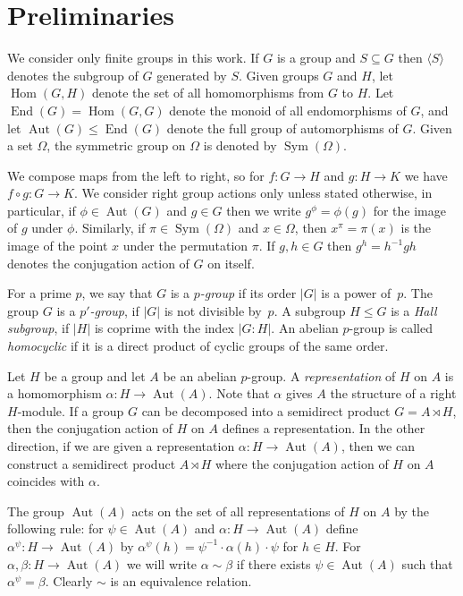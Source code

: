 \documentclass{article}
\DeclareMathOperator{\Sym}{Sym}
\DeclareMathOperator{\Aut}{Aut}
\DeclareMathOperator{\Hom}{Hom}
\DeclareMathOperator{\End}{End}
\begin{document}
\section{Preliminaries}\label{secPre}

We consider only finite groups in this work. If \( G \) is a group and \( S \subseteq G \) then \( \langle S \rangle \) denotes
the subgroup of \( G \) generated by \( S \). Given groups \( G \) and \( H \), let \( \Hom(G, H) \) denote the set of all
homomorphisms from \( G \) to \( H \). Let \( \End(G) = \Hom(G, G) \) denote the monoid of all endomorphisms of \( G \), and let \( \Aut(G) \leq \End(G) \)
denote the full group of automorphisms of \( G \). Given a set \( \Omega \), the symmetric group on \( \Omega \) is denoted by \( \Sym(\Omega) \).

We compose maps from the left to right, so for \( f : G \to H \) and \( g : H \to K \) we have \( f \circ g : G \to K \).
We consider right group actions only unless stated otherwise, in particular, if \( \phi \in \Aut(G) \) and \( g \in G \) then we write
\( g^\phi = \phi(g) \) for the image of \( g \) under \( \phi \). Similarly, if \( \pi \in \Sym(\Omega) \) and \( x \in \Omega \),
then \( x^\pi = \pi(x) \) is the image of the point \( x \) under the permutation \( \pi \). If \( g, h \in G \) then \( g^h = h^{-1}gh \)
denotes the conjugation action of \( G \) on itself.

For a prime \( p \), we say that \( G \) is a \emph{\( p \)-group} if its order \( |G| \) is a power of~\( p \).
The group \( G \) is a \emph{\( p' \)-group}, if \( |G| \) is not divisible by~\( p \). A subgroup \( H \leq G \)
is a \emph{Hall subgroup}, if \( |H| \) is coprime with the index \( |G : H| \).
An abelian \( p \)-group is called \emph{homocyclic} if it is a direct product of cyclic groups of the same order.

Let \( H \) be a group and let \( A \) be an abelian \( p \)-group.
A \emph{representation} of \( H \) on \( A \) is a homomorphism \( \alpha : H \to \Aut(A) \).
Note that \( \alpha \) gives \( A \) the structure of a right \( H \)-module.
If a group \( G \) can be decomposed into a semidirect product \( G = A \rtimes H \),
then the conjugation action of \( H \) on \( A \) defines a representation.
In the other direction, if we are given a representation \( \alpha : H \to \Aut(A) \), then we can
construct a semidirect product \( A \rtimes H \) where the conjugation action of \( H \) on \( A \)
coincides with \( \alpha \).

The group \( \Aut(A) \) acts on the set of all representations of \( H \) on \( A \) by the following rule:
for \( \psi \in \Aut(A) \) and \( \alpha : H \to \Aut(A) \) define \( \alpha^\psi : H \to \Aut(A) \) by
\( \alpha^\psi(h) = \psi^{-1} \cdot \alpha(h) \cdot \psi \) for \( h \in H \). For \( \alpha, \beta : H \to \Aut(A) \)
we will write \( \alpha \sim \beta \) if there exists \( \psi \in \Aut(A) \) such that \( \alpha^\psi = \beta \).
Clearly \( \sim \) is an equivalence relation.
\end{document}
